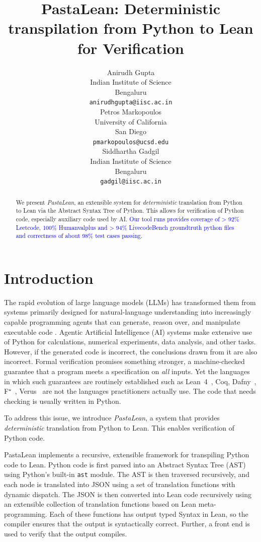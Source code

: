 \documentclass{article}
\title{PastaLean: Deterministic transpilation from Python to Lean for Verification}
\author{%
  Anirudh Gupta\\
  Indian Institute of Science\\
    Bengaluru \\
  \texttt{anirudhgupta@iisc.ac.in} \\
  \And
  Petros Markopoulos \\
  University of California \\
  San Diego \\
  \texttt{pmarkopoulos@ucsd.edu} \\
  \AND
  Siddhartha Gadgil \\
  Indian Institute of Science \\
  Bengaluru \\
  \texttt{gadgil@iisc.ac.in} \\
}
\newcommand{\code}{\lstinline}
\newcommand{\suggest}[1]{\textcolor{blue}{#1}}
\begin{document}
\maketitle


\begin{abstract}
  We present \emph{PastaLean}, an extensible system for \emph{deterministic} translation from Python to Lean via the Abstract Syntax Tree of Python. This allows for verification of Python code, especially auxiliary code used by AI. \suggest{Our tool runs provides coverage of > 92\% Leetcode, 100\% Humanvalplus and > 94\% LivecodeBench groundtruth python files and correctness of about 98\% test cases passing. }
\end{abstract}


\section{Introduction}

The rapid evolution of large language models (LLMs) has transformed them from systems primarily designed for natural-language understanding into increasingly capable programming agents that can generate, reason over, and manipulate executable code \cite{jiang2026codegeneration}. Agentic Artificial Intelligence (AI) systems make extensive use of Python for calculations, numerical experiments, data analysis, and other tasks. However, if the generated code is incorrect, the conclusions drawn from it are also incorrect. Formal verification promises something stronger, a machine-checked guarantee that a program meets a specification on \emph{all} inputs. Yet the languages in which such guarantees are routinely established such as Lean~4~\cite{moura2021lean4}, Coq, Dafny~\cite{leino2010dafny}, F$^\star$~\cite{swamy2016fstar}, Verus~\cite{lattuada2023verus} are not the languages practitioners actually use. The code that needs checking is usually written in Python.

To address this issue, we introduce \emph{PastaLean}, a system that provides \emph{deterministic} translation from Python to Lean. This enables verification of Python code.

PastaLean implements a recursive, extensible framework for transpiling Python code to Lean. Python code is first parsed into an Abstract Syntax Tree (AST) using Python's built-in \code{ast} module. The AST is then traversed recursively, and each node is translated into JSON using a set of translation functions with dynamic dispatch. The JSON is then converted into Lean code recursively using an extensible collection of translation functions based on Lean meta-programming. Each of these functions has output typed Syntax in Lean, so the compiler ensures that the output is syntactically correct. Further, a front end is used to verify that the output compiles. 
\end{document}
